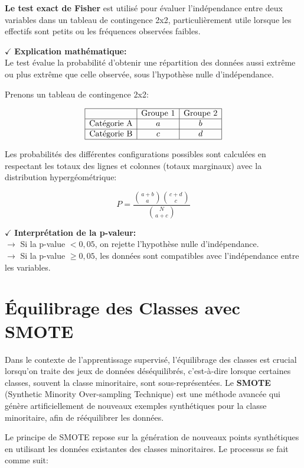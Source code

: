 \textbf{Le test exact de Fisher} \cite{fisher} est utilisé pour évaluer l'indépendance entre deux variables dans un tableau de contingence 2x2, particulièrement utile lorsque les effectifs sont petits ou les fréquences observées faibles.

\textbf{\(\checkmark\)} \textbf{Explication mathématique:}\\
Le test évalue la probabilité d'obtenir une répartition des données aussi extrême ou plus extrême que celle observée, sous l'hypothèse nulle d'indépendance.

Prenons un tableau de contingence 2x2:

\[
\begin{array}{|c|c|c|}
\hline
 & \text{Groupe 1} & \text{Groupe 2} \\
\hline
\text{Catégorie A} & a & b \\
\hline
\text{Catégorie B} & c & d \\
\hline
\end{array}
\]

Les probabilités des différentes configurations possibles sont calculées en respectant les totaux des lignes et colonnes (totaux marginaux) avec la distribution hypergéométrique:

\[
P = \frac{\binom{a+b}{a} \binom{c+d}{c}}{\binom{N}{a+c}}
\]

\textbf{\(\checkmark\)} \textbf{Interprétation de la p-valeur:}\\
\textbf{\(\rightarrow\)} Si la p-value \( < 0{,}05 \), on rejette l'hypothèse nulle d'indépendance.\\
\textbf{\(\rightarrow\)} Si la p-value \( \geq 0{,}05 \), les données sont compatibles avec l'indépendance entre les variables.

\section{Équilibrage des Classes avec SMOTE}

Dans le contexte de l'apprentissage supervisé, l'équilibrage des classes est crucial lorsqu'on traite des jeux de données déséquilibrés, c'est-à-dire lorsque certaines classes, souvent la classe minoritaire, sont sous-représentées. Le \textbf{SMOTE} (Synthetic Minority Over-sampling Technique) est une méthode avancée qui génère artificiellement de nouveaux exemples synthétiques pour la classe minoritaire, afin de rééquilibrer les données.

Le principe de SMOTE repose sur la génération de nouveaux points synthétiques en utilisant les données existantes des classes minoritaires. Le processus se fait comme suit:

